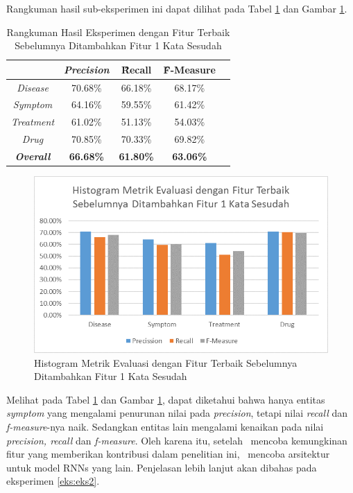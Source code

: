 	Rangkuman hasil sub-eksperimen ini dapat dilihat pada Tabel \ref{table:owndict8} dan Gambar \ref{fig:owndict8}.
	
	\begin{table}
		\centering
		\caption{Rangkuman Hasil Eksperimen dengan Fitur Terbaik Sebelumnya Ditambahkan Fitur 1 Kata Sesudah}
		\begin{tabular}{|c|c|c|c|c|}
			\hline
			& \textit{Precision} & \f{\f{Recall}} & \f{\f{F-Measure}} \\ \hline
			\textit{Disease}      & 70.68\%             & 66.18\%        & 68.17\%           \\ \hline
			\textit{Symptom}      & 64.16\%             & 59.55\%        & 61.42\%           \\ \hline
			\textit{Treatment}    & 61.02\%             & 51.13\%        & 54.03\%           \\ \hline
			\textit{Drug}		  & 70.85\%             & 70.33\%        & 69.82\%           \\ \hline
			\textit{\textbf{Overall}}&\textbf{66.68\%}  & \textbf{61.80\%}& \textbf{63.06\%} \\ \hline
		\end{tabular}
		\label{table:owndict8}
	\end{table}
	
	\begin{figure}
		\centering
		\includegraphics[width=0.85\linewidth]{images/histogram8}
		\caption{Histogram Metrik Evaluasi dengan Fitur Terbaik Sebelumnya Ditambahkan Fitur 1 Kata Sesudah}
		\label{fig:owndict8}
	\end{figure}
	
	Melihat pada Tabel \ref{table:owndict8} dan Gambar \ref{fig:owndict8}, dapat diketahui bahwa hanya entitas \textit{symptom} yang mengalami penurunan nilai pada \textit{precision}, tetapi nilai \textit{recall} dan \textit{f-measure}-nya naik. Sedangkan entitas lain mengalami kenaikan pada nilai \textit{precision, recall} dan \textit{f-measure}. Oleh karena itu, setelah \saya~mencoba kemungkinan fitur yang memberikan kontribusi dalam penelitian ini, \saya~mencoba arsitektur untuk model RNNs yang lain. Penjelasan lebih lanjut akan dibahas pada eksperimen \ref{eks:eks2}.
	
